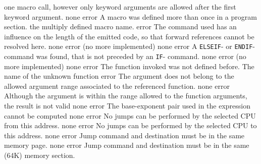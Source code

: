 \documentclass[12pt,twoside]{report}
\newcommand{\tty}[1]{{\tt #1}}
\begin{document}
\begin{description}
{                one macro call, however only keyword arguments
                are allowed after the first keyword argument.}
               {none}
               {error}
               {A macro was defined more than once in a program section.}
               {the multiply defined macro name.}
               {error}
               {The command used has an influence on the length of the
                emitted code, so that forward references cannot be resolved
                here.}
               {none}
               {error}
               {(no more implemented)}
               {none}
               {error}
               {A \tty{ELSEIF}- or \tty{ENDIF}- command was found, that is not preceded
                by an \tty{IF}- command.}
               {none}
               {error}
               {(no more implemented)}
               {none}
               {error}
               {The function invoked was not defined before.}
               {The name of the unknown function}
               {error}
               {The argument does not belong to the allowed argument range
                associated to the referenced function.}
               {none}
               {error}
               {Although the argument is within the range allowed to the
                function arguments, the result is not valid}
               {none}
               {error}
               {The base-exponent pair used in the expression cannot be
                computed}
               {none}
               {error}
               {No jumps can be performed by the selected CPU from this
                address.}
               {none}
               {error}
               {No jumps can be performed by the selected CPU to this
                address.}
               {none}
               {error}
               {Jump command and destination must be in the same memory
                page.}
               {none}
               {error}
               {Jump command and destination must be in the same (64K)
                memory section.}

\end{description}
\end{document}
